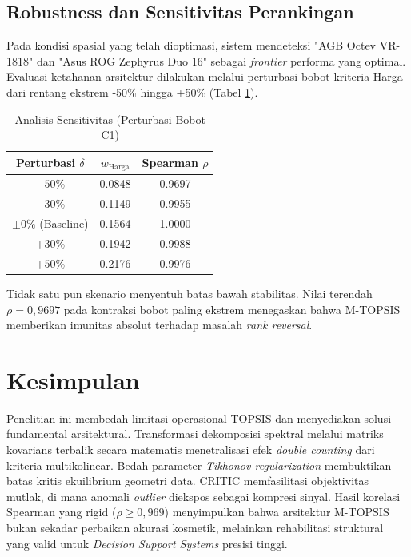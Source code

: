 \documentclass[10pt, a4paper, twocolumn]{article}
\begin{document}
\subsection{Robustness dan Sensitivitas Perankingan}

Pada kondisi spasial yang telah dioptimasi, sistem mendeteksi "AGB Octev VR-1818" dan "Asus ROG Zephyrus Duo 16" sebagai \textit{frontier} performa yang optimal. Evaluasi ketahanan arsitektur dilakukan melalui perturbasi bobot kriteria Harga dari rentang ekstrem -50\% hingga +50\% (Tabel \ref{tab:sensitivity}).

\begin{table}[H]
\centering
\caption{Analisis Sensitivitas (Perturbasi Bobot C1)}
\label{tab:sensitivity}
\small
\begin{tabular}{ccc}
\toprule
\textbf{Perturbasi $\delta$} & \textbf{$w_{\text{Harga}}$} & \textbf{Spearman $\rho$} \\
\midrule
$-50\%$ & 0.0848 & 0.9697 \\
$-30\%$ & 0.1149 & 0.9955 \\
$\pm 0\%$ (Baseline) & 0.1564 & 1.0000 \\
$+30\%$ & 0.1942 & 0.9988 \\
$+50\%$ & 0.2176 & 0.9976 \\
\bottomrule
\end{tabular}
\end{table}

Tidak satu pun skenario menyentuh batas bawah stabilitas. Nilai terendah $\rho = 0{,}9697$ pada kontraksi bobot paling ekstrem menegaskan bahwa M-TOPSIS memberikan imunitas absolut terhadap masalah \textit{rank reversal}.

\section{Kesimpulan}

Penelitian ini membedah limitasi operasional TOPSIS dan menyediakan solusi fundamental arsitektural. Transformasi dekomposisi spektral melalui matriks kovarians terbalik secara matematis menetralisasi efek \textit{double counting} dari kriteria multikolinear. Bedah parameter \textit{Tikhonov regularization} membuktikan batas kritis ekuilibrium geometri data. CRITIC memfasilitasi objektivitas mutlak, di mana anomali \textit{outlier} diekspos sebagai kompresi sinyal. Hasil korelasi Spearman yang rigid ($\rho \geq 0{,}969$) menyimpulkan bahwa arsitektur M-TOPSIS bukan sekadar perbaikan akurasi kosmetik, melainkan rehabilitasi struktural yang valid untuk \textit{Decision Support Systems} presisi tinggi.
\end{document}

